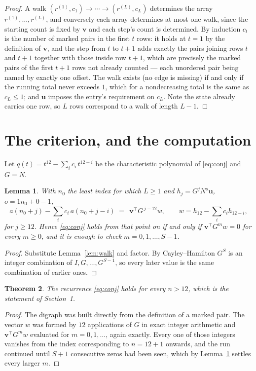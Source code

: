 \documentclass[11pt,a4paper]{article}
\theoremstyle{plain}
\newtheorem{theorem}{Theorem}
\newtheorem{lemma}[theorem]{Lemma}
\theoremstyle{definition}
\begin{document}
\begin{proof}
A walk $(r^{(1)},c_1)\to\cdots\to(r^{(L)},c_L)$ determines the array
$r^{(1)},\dots,r^{(L)}$, and conversely each array determines at most one walk, since the
starting count is fixed by $\mathbf{v}$ and each step's count is determined. By induction
$c_t$ is the number of marked pairs in the first $t$ rows: it holds at $t=1$ by the
definition of $\mathbf{v}$, and the step from $t$ to $t+1$ adds exactly the pairs joining
rows $t$ and $t+1$ together with those inside row $t+1$, which are precisely the marked
pairs of the first $t+1$ rows not already counted --- each unordered pair being named by
exactly one offset. The walk exists (no edge is missing) if and only if the running total
never exceeds $1$, which for a nondecreasing total is the same as $c_L\le1$; and
$\mathbf{u}$ imposes the entry's requirement on $c_L$. Note the state already carries one
row, so $L$ rows correspond to a walk of length $L-1$.
\end{proof}

\section{The criterion, and the computation}

Let $q(t)=t^{12}-\sum_i c_i\,t^{12-i}$ be the characteristic polynomial of
\eqref{eq:conj} and $G=N$.

\begin{lemma}\label{lem:crit}
With $n_0$ the least index for which $L\ge1$ and $h_j=G^{j}N^{o}\mathbf{u}$,
$o=1n_0+0-1$,
\[
a(n_0+j)-\sum_i c_i\,a(n_0+j-i)\;=\;\,\mathbf{v}^{\!\top}G^{\,j-12}w,
\qquad w=h_{12}-\sum_i c_i h_{12-i},
\]
for $j\ge12$. Hence \eqref{eq:conj} holds from that point on if and only if
$\mathbf{v}^{\!\top}G^{m}w=0$ for every $m\ge0$, and it is enough to check
$m=0,1,\dots,S-1$.
\end{lemma}

\begin{proof}
Substitute Lemma~\ref{lem:walk} and factor. By Cayley--Hamilton $G^{S}$ is an integer
combination of $I,G,\dots,G^{S-1}$, so every later value is the same combination of earlier
ones.
\end{proof}

\begin{theorem}
The recurrence \eqref{eq:conj} holds for every $n>12$, which is the statement of
Section~1.
\end{theorem}

\begin{proof}
The digraph was built directly from the definition of a marked pair. The vector $w$ was
formed by $12$ applications of $G$ in exact integer arithmetic and
$\mathbf{v}^{\!\top}G^{m}w$ evaluated for $m=0,1,\dots$, again exactly. Every one of
those integers vanishes from the index corresponding to $n=12+1$ onwards, and the run
continued until $S+1$ consecutive zeros had been seen, which by Lemma~\ref{lem:crit}
settles every larger $m$.
\end{proof}
\end{document}
